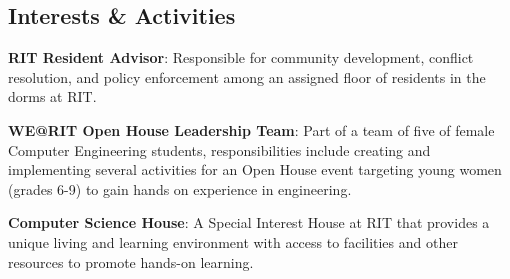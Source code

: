\documentclass[a4paper,margin,line]{resume}
\begin{document}
\begin{resume}
\section{\mysidestyle Interests \& Activities}
    \begin{asparablank}
        \item \textbf{RIT Resident Advisor}: Responsible for community development, conflict resolution, and policy enforcement among an assigned floor of residents in the dorms at RIT.\\
        \item \textbf{WE@RIT Open House Leadership Team}: Part of a team of five of female Computer Engineering students, responsibilities include creating and implementing several activities for an Open House event targeting young women (grades 6-9) to gain hands on experience in engineering.\\
        \item \textbf{Computer Science House}: A Special Interest House at RIT that
            provides a unique living and learning environment with access to facilities and other resources to promote hands-on learning.\\
    \end{asparablank}
\end{resume}
\end{document}

